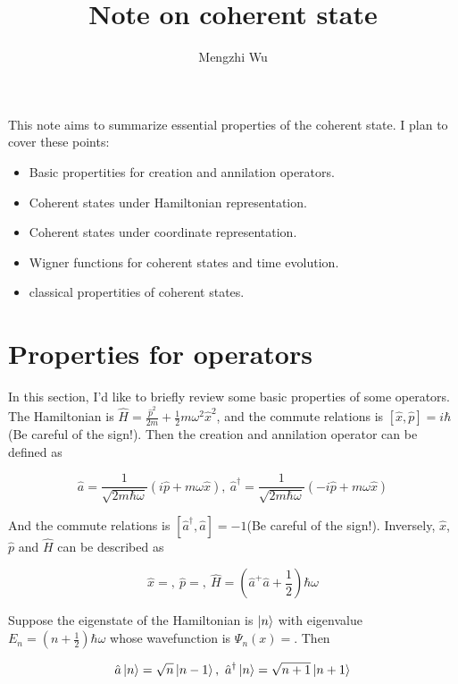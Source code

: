 \documentclass{article}
\title{Note on coherent state}
\author{Mengzhi Wu}
\begin{document}
    \maketitle

    This note aims to summarize essential properties of the coherent state. I plan to cover these points:

    \begin{itemize}
        \item Basic propertities for creation and annilation operators.
        \item Coherent states under Hamiltonian representation.
        \item Coherent states under coordinate representation.
        \item Wigner functions for coherent states and time evolution.
        \item classical propertities of coherent states.
    \end{itemize}

    \section{Properties for operators}
        In this section, I'd like to briefly review some basic properties of some operators. The Hamiltonian is $\hat{H}=\frac{\hat{p}^2}{2m}+\frac{1}{2}m\omega^2\hat{x}^2$, and the commute relations is $[\hat{x},\hat{p}]=i\hbar$(Be careful of the sign!). Then the creation and annilation operator can be defined as 

        \begin{equation}
            \hat{a}= \frac{1}{\sqrt{2m\hbar\omega}}(i\hat{p}+m\omega\hat{x}), \ \hat{a}^\dagger=\frac{1}{\sqrt{2m\hbar\omega}}(-i\hat{p}+m\omega\hat{x})
        \end{equation}

        And the commute relations is $[\hat{a}^\dagger, \hat{a}]=-1$(Be careful of the sign!). Inversely, $\hat{x}$, $\hat{p}$ and $\hat{H}$ can be described as 

        \begin{equation}
            \hat{x}= ,\ \hat{p}= ,\ \hat{H}=(\hat{a}^+\hat{a}+\frac{1}{2})\hbar\omega
        \end{equation}

        Suppose the eigenstate of the Hamiltonian is $\ket{n}$ with eigenvalue $E_n=(n+\frac{1}{2})\hbar\omega$ whose wavefunction is $\Psi_n(x)=$. Then 

        \begin{equation}
            \hat{a}\ket{n}=\sqrt{n}\ket{n-1},\ \hat{a}^\dagger\ket{n}=\sqrt{n+1}\ket{n+1}
        \end{equation}
\end{document}
